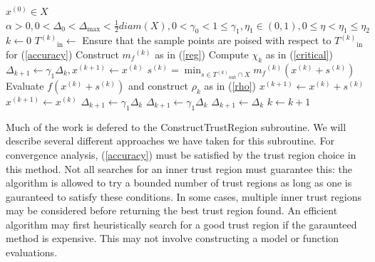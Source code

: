 \documentclass{article}
\theoremstyle{case}
\newcommand{\domain}{X}
\newcommand{\modelk}{{{m}_f}^{(k)}}
\newcommand{\iteratek}{{x}^{(k)}}
\newcommand{\trialk}{{s}^{(k)}}
\newcommand{\iteratekpone}{{x}^{(k+1)}}
\newcommand{\innertrk}{{T^{(k)}}_{\text{in}}}
\newcommand{\outertrk}{{T^{(k)}}_{\text{out}}}
\let\oldref\ref
\renewcommand{\ref}[1]{(\oldref{#1})}
\begin{document}
\begin{algorithmic}

\State $x^{(0)} \in \domain$
\State $\alpha > 0, 0 < \Delta_0 < \Delta_{\text{max}} < \frac 1 2 diam(\domain), 0 < \gamma_{0} < 1 \le \gamma_{1}, \eta_1 \in (0,1), 0 \le \eta < \eta_1 \le \eta_2$
\State $k \gets 0$
\Loop
    \State $\innertrk\gets $ 
    \State Ensure that the sample points are poised with respect to $\innertrk$ for \ref{accuracy}
    \State Construct $\modelk$ as in \ref{reg}
    \State Compute $\chi_k$ as in \ref{critical}
        \State $\Delta_{k+1} \gets \gamma_1 \Delta_{k}, x^{(k+1)} \gets \iteratek$
    \Else
        \State $\trialk = \min_{s \in \outertrk \cap \domain} \modelk(\iteratek + \trialk)$
        \State Evaluate $f(\iteratek + \trialk)$ and construct $\rho_k$ as in \ref{rho}
            \State $ \iteratekpone \gets \iteratek + \trialk$
        \Else
            \State $\iteratekpone \gets \iteratek $
        \EndIf
            \State $\Delta_{k+1} \gets \gamma_1\Delta_k$
        \Else
            \If{$\rho_k > \eta_2 \wedge \|\trialk\| = \Delta_k$}
                \State $\Delta_{k+1} \gets \gamma_1\Delta_k$
            \Else
                \State $\Delta_{k+1} \gets \Delta_{k}$
            \EndIf
        \EndIf
    \EndIf
    \State $k \gets k+1$
\EndLoop
\end{algorithmic}

Much of the work is defered to the ConstructTrustRegion subroutine.
We will describe several different approaches we have taken for this subroutine.
For convergence analysis, \ref{accuracy} must be satisfied by the trust region choice in this method.
Not all searches for an inner trust region must guarantee this: the algorithm is allowed to try a bounded number of trust regions as long as one is gauranteed to satisfy these conditions.
In some cases, multiple inner trust regions may be considered before returning the best trust region found.
An efficient algorithm may first heuristically search for a good trust region if the garaunteed method is expensive.
This may not involve constructing a model or function evaluations.





%
%
\end{document}

